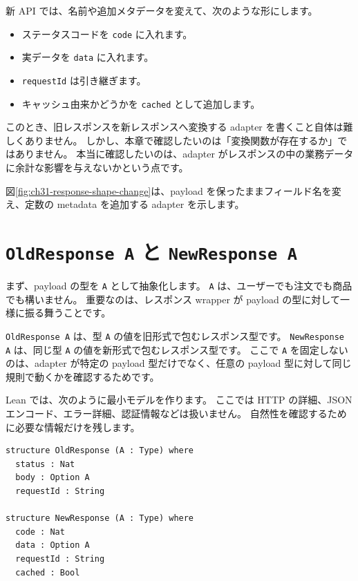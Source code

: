 新 API では、名前や追加メタデータを変えて、次のような形にします。

\begin{itemize}
\item ステータスコードを \texttt{code} に入れます。
\item 実データを \texttt{data} に入れます。
\item \texttt{requestId} は引き継ぎます。
\item キャッシュ由来かどうかを \texttt{cached} として追加します。
\end{itemize}

このとき、旧レスポンスを新レスポンスへ変換する adapter を書くこと自体は難しくありません。
しかし、本章で確認したいのは「変換関数が存在するか」ではありません。
本当に確認したいのは、adapter がレスポンスの中の業務データに余計な影響を与えないかという点です。

図\ref{fig:ch31-response-shape-change}は、payload を保ったままフィールド名を変え、定数の metadata を追加する adapter を示します。


\section{\texttt{OldResponse A} と \texttt{NewResponse A}}

まず、payload の型を \texttt{A} として抽象化します。
\texttt{A} は、ユーザーでも注文でも商品でも構いません。
重要なのは、レスポンス wrapper が payload の型に対して一様に振る舞うことです。

\texttt{OldResponse A} は、型 \texttt{A} の値を旧形式で包むレスポンス型です。
\texttt{NewResponse A} は、同じ型 \texttt{A} の値を新形式で包むレスポンス型です。
ここで \texttt{A} を固定しないのは、adapter が特定の payload 型だけでなく、任意の payload 型に対して同じ規則で動くかを確認するためです。

Lean では、次のように最小モデルを作ります。
ここでは HTTP の詳細、JSON エンコード、エラー詳細、認証情報などは扱いません。
自然性を確認するために必要な情報だけを残します。

\begin{listing}[htbp]
\begin{verbatim}
structure OldResponse (A : Type) where
  status : Nat
  body : Option A
  requestId : String

structure NewResponse (A : Type) where
  code : Nat
  data : Option A
  requestId : String
  cached : Bool
\end{verbatim}
\caption{\texttt{OldResponse} と \texttt{NewResponse}}
\label{lst:ch31-response-types}
\end{listing}


